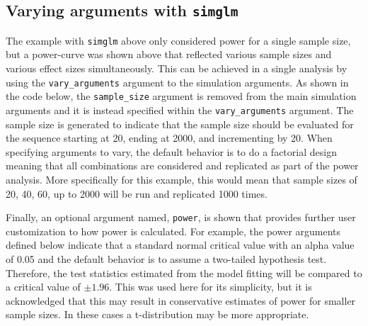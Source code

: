 \documentclass[man,mask,floatsintext]{apa6}
\begin{document}
\hypertarget{varying-arguments-with-simglm}{%
\subsection{\texorpdfstring{Varying arguments with \texttt{simglm}}{Varying arguments with simglm}}\label{varying-arguments-with-simglm}}

The example with \texttt{simglm} above only considered power for a single sample size, but a power-curve was shown above that reflected various sample sizes and various effect sizes simultaneously. This can be achieved in a single analysis by using the \texttt{vary\_arguments} argument to the simulation arguments. As shown in the code below, the \texttt{sample\_size} argument is removed from the main simulation arguments and it is instead specified within the \texttt{vary\_arguments} argument. The sample size is generated to indicate that the sample size should be evaluated for the sequence starting at 20, ending at 2000, and incrementing by 20. When specifying arguments to vary, the default behavior is to do a factorial design meaning that all combinations are considered and replicated as part of the power analysis. More specifically for this example, this would mean that sample sizes of 20, 40, 60, up to 2000 will be run and replicated 1000 times.

Finally, an optional argument named, \texttt{power}, is shown that provides further user customization to how power is calculated. For example, the power arguments defined below indicate that a standard normal critical value with an alpha value of 0.05 and the default behavior is to assume a two-tailed hypothesis test. Therefore, the test statistics estimated from the model fitting will be compared to a critical value of \(\pm 1.96\). This was used here for its simplicity, but it is acknowledged that this may result in conservative estimates of power for smaller sample sizes. In these cases a t-distribution may be more appropriate.
\end{document}
